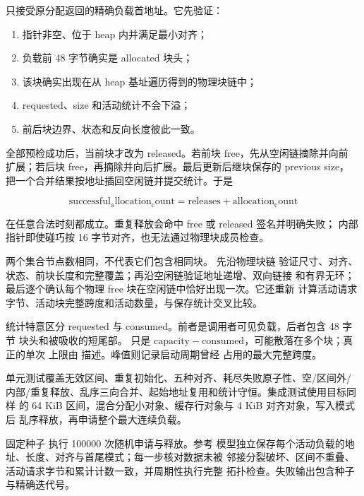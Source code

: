  只接受原分配返回的精确负载首地址。它先验证：

\begin{enumerate}[label=\arabic*.]
  \item 指针非空、位于 heap 内并满足最小对齐；
  \item 负载前 48 字节确实是 allocated 块头；
  \item 该块确实出现在从 heap 基址遍历得到的物理块链中；
  \item requested、size 和活动统计不会下溢；
  \item 前后块边界、状态和反向长度彼此一致。
\end{enumerate}

全部预检成功后，当前块才改为 released。若前块 free，先从空闲链摘除并向前
扩展；若后块 free，再摘除并向后扩展。最后更新后继块保存的 previous size，
把一个合并结果按地址插回空闲链并提交统计。于是

\[
  \mathrm{successful_allocation_count}
  =
  \mathrm{releases}
  +
  \mathrm{allocation_count}
\]

在任意合法时刻都成立。重复释放会命中 free 或 released 签名并明确失败；
内部指针即使碰巧按 16 字节对齐，也无法通过物理块成员检查。

两个集合节点数相同，不代表它们包含相同块。 先沿物理块链
验证尺寸、对齐、状态、前块长度和完整覆盖；再沿空闲链验证地址递增、双向链接
和有界无环；最后逐个确认每个物理 free 块在空闲链中恰好出现一次。它还重新
计算活动请求字节、活动块完整跨度和活动数量，与保存统计交叉比较。

统计特意区分 requested 与 consumed。前者是调用者可见负载，后者包含 48 字节
块头和被吸收的短尾部。 只是
\(\mathrm{capacity}-\mathrm{consumed}\)，可能散落在多个块；真正的单次
上限由  描述。峰值则记录启动周期曾经
占用的最大完整跨度。

单元测试覆盖无效区间、重复初始化、五种对齐、耗尽失败原子性、空/区间外/
内部/重复释放、乱序三向合并、起始地址复用和统计守恒。集成测试使用目标同样
的 64 KiB 区间，混合分配小对象、缓存行对象与 4 KiB 对齐对象，写入模式后
乱序释放，再申请整个最大连续负载。

固定种子  执行 100000 次随机申请与释放。参考
模型独立保存每个活动负载的地址、长度、对齐与首尾模式；每一步核对数据未被
邻接分裂破坏、区间不重叠、活动请求字节和累计计数一致，并周期性执行完整
拓扑检查。失败输出包含种子与精确迭代号。

